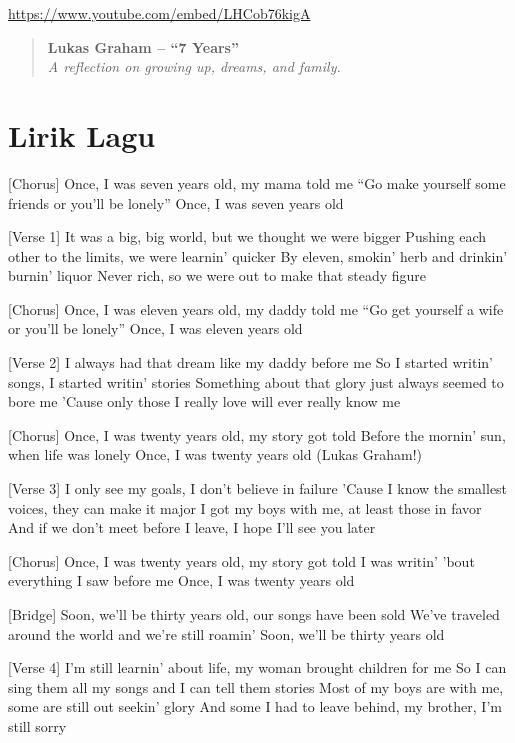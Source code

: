 \documentclass[
  letterpaper,
  DIV=11,
  numbers=noendperiod]{scrreprt}
\begin{document}
\url{https://www.youtube.com/embed/LHCob76kigA}

\begin{quote}
\textbf{Lukas Graham -- ``7 Years''}\\
\emph{A reflection on growing up, dreams, and family.}
\end{quote}

\section{Lirik Lagu}\label{lirik-lagu}

{[}Chorus{]} Once, I was seven years old, my mama told me ``Go make
yourself some friends or you'll be lonely'' Once, I was seven years old

{[}Verse 1{]} It was a big, big world, but we thought we were bigger
Pushing each other to the limits, we were learnin' quicker By eleven,
smokin' herb and drinkin' burnin' liquor Never rich, so we were out to
make that steady figure

{[}Chorus{]} Once, I was eleven years old, my daddy told me ``Go get
yourself a wife or you'll be lonely'' Once, I was eleven years old

{[}Verse 2{]} I always had that dream like my daddy before me So I
started writin' songs, I started writin' stories Something about that
glory just always seemed to bore me 'Cause only those I really love will
ever really know me

{[}Chorus{]} Once, I was twenty years old, my story got told Before the
mornin' sun, when life was lonely Once, I was twenty years old (Lukas
Graham!)

{[}Verse 3{]} I only see my goals, I don't believe in failure 'Cause I
know the smallest voices, they can make it major I got my boys with me,
at least those in favor And if we don't meet before I leave, I hope I'll
see you later

{[}Chorus{]} Once, I was twenty years old, my story got told I was
writin' 'bout everything I saw before me Once, I was twenty years old

{[}Bridge{]} Soon, we'll be thirty years old, our songs have been sold
We've traveled around the world and we're still roamin' Soon, we'll be
thirty years old

{[}Verse 4{]} I'm still learnin' about life, my woman brought children
for me So I can sing them all my songs and I can tell them stories Most
of my boys are with me, some are still out seekin' glory And some I had
to leave behind, my brother, I'm still sorry
\end{document}
